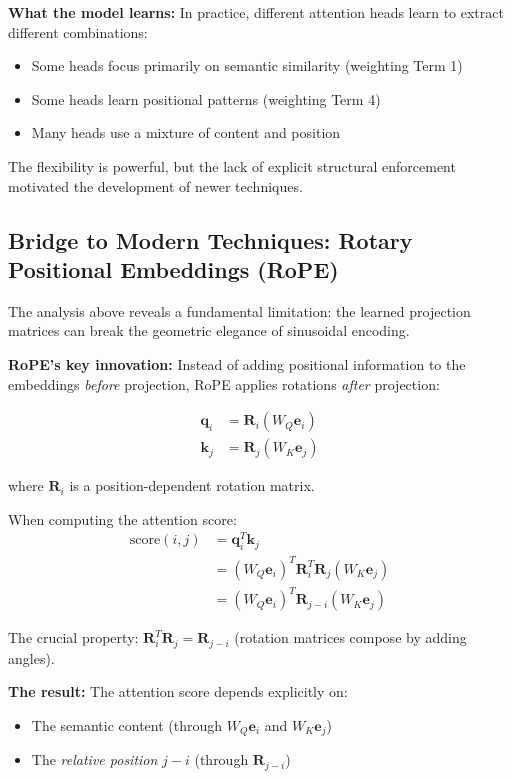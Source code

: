 \documentclass{article}
\begin{document}
\textbf{What the model learns:} In practice, different attention heads learn to extract different combinations:
\begin{itemize}
\item Some heads focus primarily on semantic similarity (weighting Term 1)
\item Some heads learn positional patterns (weighting Term 4)
\item Many heads use a mixture of content and position
\end{itemize}

The flexibility is powerful, but the lack of explicit structural enforcement motivated the development of newer techniques.

\subsection{Bridge to Modern Techniques: Rotary Positional Embeddings (RoPE)}

The analysis above reveals a fundamental limitation: the learned projection matrices can break the geometric elegance of sinusoidal encoding.

\textbf{RoPE's key innovation:} Instead of adding positional information to the embeddings \textit{before} projection, RoPE applies rotations \textit{after} projection:

\begin{align}
\mathbf{q}_i &= \mathbf{R}_i (W_Q \mathbf{e}_i) \\
\mathbf{k}_j &= \mathbf{R}_j (W_K \mathbf{e}_j)
\end{align}

where $\mathbf{R}_i$ is a position-dependent rotation matrix.

When computing the attention score:
\begin{align}
\text{score}(i, j) &= \mathbf{q}_i^T \mathbf{k}_j \\
&= (W_Q \mathbf{e}_i)^T \mathbf{R}_i^T \mathbf{R}_j (W_K \mathbf{e}_j) \\
&= (W_Q \mathbf{e}_i)^T \mathbf{R}_{j-i} (W_K \mathbf{e}_j)
\end{align}

The crucial property: $\mathbf{R}_i^T \mathbf{R}_j = \mathbf{R}_{j-i}$ (rotation matrices compose by adding angles).

\textbf{The result:} The attention score depends explicitly on:
\begin{itemize}
\item The semantic content (through $W_Q \mathbf{e}_i$ and $W_K \mathbf{e}_j$)
\item The \textit{relative position} $j - i$ (through $\mathbf{R}_{j-i}$)
\end{itemize}
\end{document}
